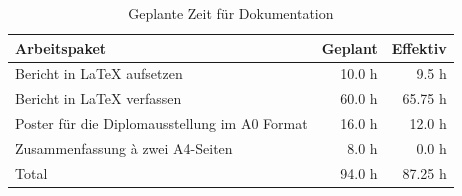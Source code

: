   \begin{table}[htb]
    \sffamily 
    \begin{center}
      \begin{tabular}{p{9cm}rr}
        \toprule
        \textbf{Arbeitspaket} & \textbf{Geplant} & \textbf{Effektiv} \\
        \midrule
        Bericht in \LaTeX{} aufsetzen &
        10.0 h &
        9.5 h\\
        Bericht in \LaTeX{} verfassen &
        60.0 h &
        65.75 h\\
        Poster für die Diplomausstellung im A0 Format &
        16.0 h &
        12.0 h\\
        Zusammenfassung à zwei A4-Seiten &
        8.0 h &
        0.0 h\\
        \bottomrule
        Total &
        94.0 h &
        87.25 h\\
        \bottomrule
      \end{tabular}
      \caption{Geplante Zeit für Dokumentation}
      \label{tab:documentationPlaning}
    \end{center}
  \end{table}
  
